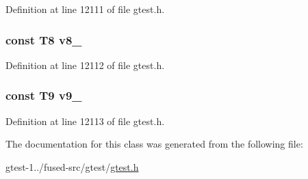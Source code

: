 \-Definition at line 12111 of file gtest.\-h.

\hypertarget{classtesting_1_1internal_1_1ValueArray35_a596bc5260b2474271d1f6910ff6f665d}{
\subsubsection[{v8\-\_\-}]{\setlength{\rightskip}{0pt plus 5cm}const \-T8 {\bf v8\-\_\-}}}\label{df/d51/classtesting_1_1internal_1_1ValueArray35_a596bc5260b2474271d1f6910ff6f665d}


\-Definition at line 12112 of file gtest.\-h.

\hypertarget{classtesting_1_1internal_1_1ValueArray35_a6356e16cf54a9dfac8525f20242af31e}{
\subsubsection[{v9\-\_\-}]{\setlength{\rightskip}{0pt plus 5cm}const \-T9 {\bf v9\-\_\-}}}\label{df/d51/classtesting_1_1internal_1_1ValueArray35_a6356e16cf54a9dfac8525f20242af31e}


\-Definition at line 12113 of file gtest.\-h.



\-The documentation for this class was generated from the following file\-:\begin{DoxyCompactItemize}
\item 
gtest-\/1../fused-\/src/gtest/\hyperlink{fused-src_2gtest_2gtest_8h}{gtest.\-h}\end{DoxyCompactItemize}
